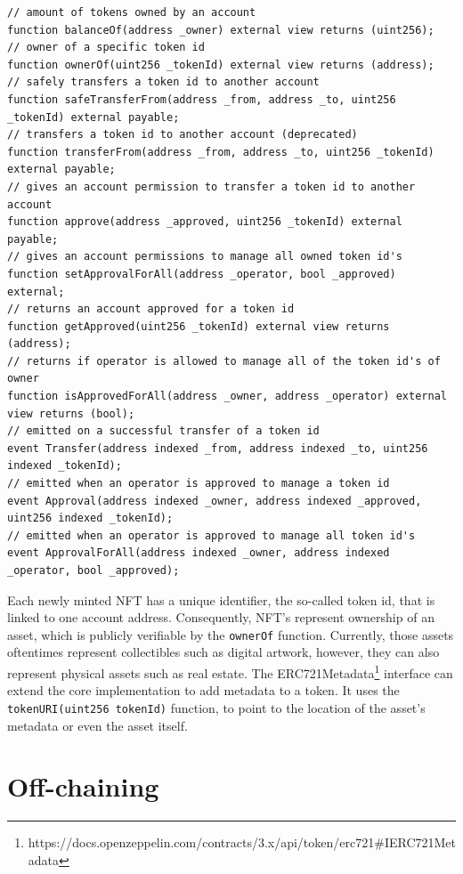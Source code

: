 \begin{lstlisting}[language=Solidity,caption={Core interface of an ERC-721 compliant token},label={lst:erc721-implementation}]
// amount of tokens owned by an account
function balanceOf(address _owner) external view returns (uint256);
// owner of a specific token id
function ownerOf(uint256 _tokenId) external view returns (address);
// safely transfers a token id to another account
function safeTransferFrom(address _from, address _to, uint256 _tokenId) external payable;
// transfers a token id to another account (deprecated)
function transferFrom(address _from, address _to, uint256 _tokenId) external payable;
// gives an account permission to transfer a token id to another account
function approve(address _approved, uint256 _tokenId) external payable;
// gives an account permissions to manage all owned token id's
function setApprovalForAll(address _operator, bool _approved) external;
// returns an account approved for a token id
function getApproved(uint256 _tokenId) external view returns (address);
// returns if operator is allowed to manage all of the token id's of owner 
function isApprovedForAll(address _owner, address _operator) external view returns (bool);
// emitted on a successful transfer of a token id
event Transfer(address indexed _from, address indexed _to, uint256 indexed _tokenId);
// emitted when an operator is approved to manage a token id
event Approval(address indexed _owner, address indexed _approved, uint256 indexed _tokenId);
// emitted when an operator is approved to manage all token id's
event ApprovalForAll(address indexed _owner, address indexed _operator, bool _approved);
\end{lstlisting}

Each newly minted NFT has a unique identifier, the so-called token id, that is linked to one account address. Consequently, NFT's represent ownership of an asset, which is publicly verifiable by the \texttt{ownerOf} function. Currently, those assets oftentimes represent collectibles such as digital artwork, however, they can also represent physical assets such as real estate. The ERC721Metadata\footnote{https://docs.openzeppelin.com/contracts/3.x/api/token/erc721\#IERC721Metadata} interface can extend the core implementation to add metadata to a token. It uses the \texttt{tokenURI(uint256 tokenId)} function, to point to the location of the asset's metadata or even the asset itself.

\section{Off-chaining}
\label{sec:onoff}

